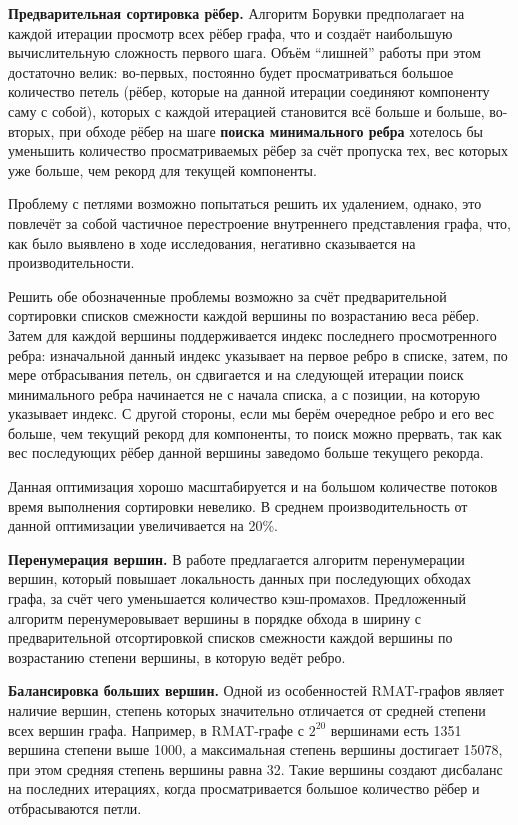 \documentclass[a4paper,12pt]{extarticle}
\begin{document}
\textbf{Предварительная сортировка рёбер.}
Алгоритм Борувки предполагает на каждой итерации просмотр всех рёбер графа, что и создаёт наибольшую вычислительную сложность первого шага.
Объём ``лишней'' работы при этом достаточно велик: 
во-первых, постоянно будет просматриваться большое количество петель (рёбер, которые на данной итерации соединяют компоненту саму с собой), которых с каждой итерацией становится всё больше и больше, 
во-вторых, при обходе рёбер на шаге \textbf{поиска минимального ребра} хотелось бы уменьшить количество просматриваемых рёбер за счёт пропуска тех, вес которых уже больше, чем рекорд для текущей компоненты.

Проблему с петлями возможно попытаться решить их удалением, однако, это повлечёт за собой частичное перестроение внутреннего представления графа, что, как было выявлено в ходе исследования, негативно сказывается на производительности.

Решить обе обозначенные проблемы возможно за счёт предварительной сортировки списков смежности каждой вершины по возрастанию веса рёбер. Затем для каждой вершины поддерживается индекс последнего просмотренного ребра: изначальной данный индекс указывает на первое ребро в списке, затем, по мере отбрасывания петель, он сдвигается и на следующей итерации поиск минимального ребра начинается не с начала списка, а с позиции, на которую указывает индекс. С другой стороны, если мы берём очередное ребро и его вес больше, чем текущий рекорд для компоненты, то поиск можно прервать, так как вес последующих рёбер данной вершины заведомо больше текущего рекорда.

Данная оптимизация хорошо масштабируется и на большом количестве потоков время выполнения сортировки невелико. В среднем производительность от данной оптимизации увеличивается на 20\%.



\textbf{Перенумерация вершин.}
В работе \cite{sparse-matrix-renum} предлагается алгоритм перенумерации вершин, который повышает локальность данных при последующих обходах графа, за счёт чего уменьшается количество кэш-промахов. 
Предложенный алгоритм перенумеровывает вершины в порядке обхода в ширину с предварительной отсортировкой списков смежности каждой вершины по возрастанию степени вершины, в которую ведёт ребро.


\textbf{Балансировка больших вершин.}
Одной из особенностей RMAT-графов являет наличие вершин, степень которых значительно отличается от средней степени всех вершин графа. Например, в RMAT-графе с $2^{20}$ вершинами есть 1351 вершина степени выше 1000, а максимальная степень вершины достигает 15078, при этом средняя степень вершины равна 32. Такие вершины создают дисбаланс на последних итерациях, когда просматривается большое количество рёбер и отбрасываются петли.
\end{document}
